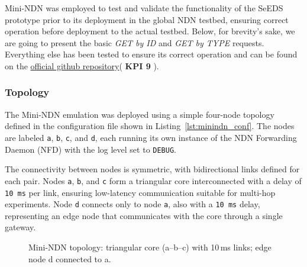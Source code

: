 \documentclass{article}
\begin{document}
Mini-NDN was employed to test and validate the functionality of the SeEDS prototype prior to its deployment in the global NDN testbed, ensuring correct operation before deployment to the actual testbed. Below, for brevity's sake, we are going to present the basic \emph{GET by ID} and \emph{GET by TYPE} requests. Everything else has been tested to ensure its correct operation and can be found on the \href{https://github.com/mmlab-aueb/SeEDS/blob/main/README.md}{official github repository}( \textbf{KPI 9} ).


\subsubsection{Topology}

The Mini-NDN emulation was deployed using a simple four-node topology defined in the configuration file shown in Listing~\ref{lst:minindn_conf}. The nodes are labeled \texttt{a}, \texttt{b}, \texttt{c}, and \texttt{d}, each running its own instance of the NDN Forwarding Daemon (NFD) with the log level set to \texttt{DEBUG}.

The connectivity between nodes is symmetric, with bidirectional links defined for each pair. Nodes \texttt{a}, \texttt{b}, and \texttt{c} form a triangular core interconnected with a delay of \texttt{10\,ms} per link, ensuring low-latency communication suitable for multi-hop experiments. Node \texttt{d} connects only to node \texttt{a}, also with a \texttt{10\,ms} delay, representing an edge node that communicates with the core through a single gateway.

\begin{figure}[H]
\centering
{}
\caption{Mini-NDN topology: triangular core (a–b–c) with 10\,ms links; edge node d connected to a.}
\label{fig:minindn_topology}
\end{figure}
\end{document}
